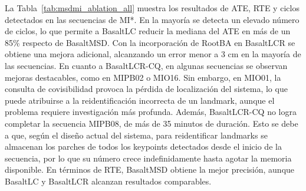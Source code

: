 La Tabla~\ref{tab:msdmi_ablation_all} muestra los resultados de ATE, RTE y ciclos detectados en las secuencias de MI*. En la mayoría se detecta un elevado número de ciclos, lo que permite a BasaltLC reducir la mediana del ATE en más de un 85\% respecto de BasaltMSD. Con la incorporación de RootBA en BasaltLCR se obtiene una mejora adicional, alcanzando un error menor a 3 cm en la mayoría de las secuencias. En cuanto a BasaltLCR-CQ, en algunas secuencias se observan mejoras destacables, como en MIPB02 o MIO16. Sin embargo, en MIO01, la consulta de covisibilidad provoca la pérdida de localización del sistema, lo que puede atribuirse a la reidentificación incorrecta de un landmark, aunque el problema requiere investigación más profunda. Además, BasaltLCR-CQ no logra completar la secuencia MIPB08, de más de 35 minutos de duración. Esto se debe a que, según el diseño actual del sistema, para reidentificar landmarks se almacenan los parches de todos los keypoints detectados desde el inicio de la secuencia, por lo que su número crece indefinidamente hasta agotar la memoria disponible. En términos de RTE, BasaltMSD obtiene la mejor precisión, aunque BasaltLC y BasaltLCR alcanzan resultados comparables.
%
